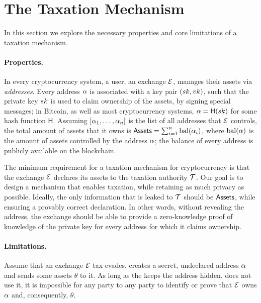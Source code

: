 \section{The Taxation Mechanism}\label{sec:taxation}

In this section we explore the necessary properties and core limitations of a
taxation mechanism.

\paragraph{Properties.}

In every cryptocurrency system, a user, \eg an exchange $\mathcal{E}$, manages
their assets via \emph{addresses}. Every address $\alpha$ is associated with
a key pair $(sk, vk)$, such that the private key $sk$ is used to claim
ownership of the assets, \eg by signing special messages; in Bitcoin, as well
as most cryptocurrency systems, $\alpha = \mathsf{H}(sk)$ for some hash
function $\mathsf{H}$.  Assuming $[\alpha_1, \dots, \alpha_n]$ is the list
of all addresses that $\mathcal{E}$ controls, the total amount of assets that it
owns is $\mathsf{Assets} = \sum_{i=1}^n \text{bal}(\alpha_i)$, where
$\text{bal}(\alpha)$ is the amount of assets controlled by the address
$\alpha$; the balance of every address is publicly available on the
blockchain.

The minimum requirement for a taxation mechanism for cryptocurrency is that the
exchange $\mathcal{E}$ declares its assets to the taxation authority $\mathcal{T}$.
Our goal is to design a mechanism that enables taxation, while retaining as
much privacy as possible. Ideally, the only information that is leaked to
$\mathcal{T}$ should be $\mathsf{Assets}$, while ensuring a provably correct declaration.
In other words, without revealing the address, the exchange should be able to
provide a zero-knowledge proof of knowledge of the private key for every
address for which it claims ownership.

\paragraph{Limitations.}

Assume that an exchange $\mathcal{E}$ tax evades, \ie creates a secret,
undeclared address $\alpha$ and sends some assets $\theta$ to it. As long as
the keeps the address hidden, \ie does not use it, it is impossible for any
party to any party to identify or prove that $\mathcal{E}$ owns $\alpha$ and,
consequently, $\theta$.

